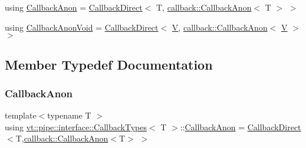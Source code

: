 \begin{DoxyCompactItemize}
\item 
using \hyperlink{structvt_1_1pipe_1_1interface_1_1_callback_types_a52218055bf91dd2e473b198f7eace9e6}{Callback\+Anon} = \hyperlink{structvt_1_1pipe_1_1interface_1_1_callback_direct}{Callback\+Direct}$<$ T, \hyperlink{structvt_1_1pipe_1_1callback_1_1_callback_anon}{callback\+::\+Callback\+Anon}$<$ T $>$ $>$
\item 
using \hyperlink{structvt_1_1pipe_1_1interface_1_1_callback_types_a0699ca2944ce08d465bed48036213a3f}{Callback\+Anon\+Void} = \hyperlink{structvt_1_1pipe_1_1interface_1_1_callback_direct}{Callback\+Direct}$<$ \hyperlink{structvt_1_1pipe_1_1interface_1_1_callback_types_aa4679a7719d01aefcc378cac3d3fa7a2}{V}, \hyperlink{structvt_1_1pipe_1_1callback_1_1_callback_anon}{callback\+::\+Callback\+Anon}$<$ \hyperlink{structvt_1_1pipe_1_1interface_1_1_callback_types_aa4679a7719d01aefcc378cac3d3fa7a2}{V} $>$ $>$
\end{DoxyCompactItemize}


\subsection{Member Typedef Documentation}
\mbox{\label{structvt_1_1pipe_1_1interface_1_1_callback_types_a52218055bf91dd2e473b198f7eace9e6}} 
\subsubsection{\texorpdfstring{Callback\+Anon}{CallbackAnon}}
{\footnotesize\ttfamily template$<$typename T $>$ \\
using \hyperlink{structvt_1_1pipe_1_1interface_1_1_callback_types}{vt\+::pipe\+::interface\+::\+Callback\+Types}$<$ T $>$\+::\hyperlink{structvt_1_1pipe_1_1interface_1_1_callback_types_a52218055bf91dd2e473b198f7eace9e6}{Callback\+Anon} =  \hyperlink{structvt_1_1pipe_1_1interface_1_1_callback_direct}{Callback\+Direct}$<$T,\hyperlink{structvt_1_1pipe_1_1callback_1_1_callback_anon}{callback\+::\+Callback\+Anon}$<$T$>$ $>$}

\mbox{\label{structvt_1_1pipe_1_1interface_1_1_callback_types_a0699ca2944ce08d465bed48036213a3f}} 
